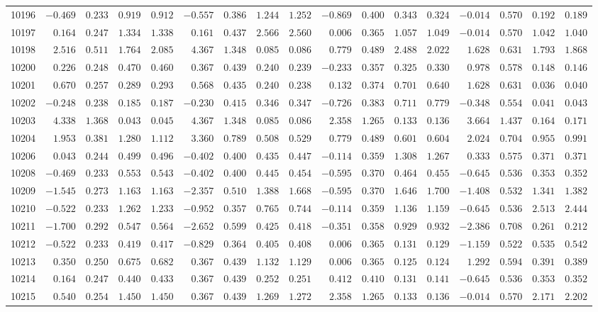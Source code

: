 \documentclass[6pt]{article}
\begin{document}
\begin{landscape}
{\begin{longtable}{lrrrrrrrrrrrrrrrr}
10196&$-0.469$&$0.233$&$0.919$&$0.912$&$-0.557$&$0.386$&$1.244$&$1.252$&$-0.869$&$0.400$&$0.343$&$0.324$&$-0.014$&$0.570$&$0.192$&$0.189$\tabularnewline
10197&$ 0.164$&$0.247$&$1.334$&$1.338$&$ 0.161$&$0.437$&$2.566$&$2.560$&$ 0.006$&$0.365$&$1.057$&$1.049$&$-0.014$&$0.570$&$1.042$&$1.040$\tabularnewline
10198&$ 2.516$&$0.511$&$1.764$&$2.085$&$ 4.367$&$1.348$&$0.085$&$0.086$&$ 0.779$&$0.489$&$2.488$&$2.022$&$ 1.628$&$0.631$&$1.793$&$1.868$\tabularnewline
10200&$ 0.226$&$0.248$&$0.470$&$0.460$&$ 0.367$&$0.439$&$0.240$&$0.239$&$-0.233$&$0.357$&$0.325$&$0.330$&$ 0.978$&$0.578$&$0.148$&$0.146$\tabularnewline
10201&$ 0.670$&$0.257$&$0.289$&$0.293$&$ 0.568$&$0.435$&$0.240$&$0.238$&$ 0.132$&$0.374$&$0.701$&$0.640$&$ 1.628$&$0.631$&$0.036$&$0.040$\tabularnewline
10202&$-0.248$&$0.238$&$0.185$&$0.187$&$-0.230$&$0.415$&$0.346$&$0.347$&$-0.726$&$0.383$&$0.711$&$0.779$&$-0.348$&$0.554$&$0.041$&$0.043$\tabularnewline
10203&$ 4.338$&$1.368$&$0.043$&$0.045$&$ 4.367$&$1.348$&$0.085$&$0.086$&$ 2.358$&$1.265$&$0.133$&$0.136$&$ 3.664$&$1.437$&$0.164$&$0.171$\tabularnewline
10204&$ 1.953$&$0.381$&$1.280$&$1.112$&$ 3.360$&$0.789$&$0.508$&$0.529$&$ 0.779$&$0.489$&$0.601$&$0.604$&$ 2.024$&$0.704$&$0.955$&$0.991$\tabularnewline
10206&$ 0.043$&$0.244$&$0.499$&$0.496$&$-0.402$&$0.400$&$0.435$&$0.447$&$-0.114$&$0.359$&$1.308$&$1.267$&$ 0.333$&$0.575$&$0.371$&$0.371$\tabularnewline
10208&$-0.469$&$0.233$&$0.553$&$0.543$&$-0.402$&$0.400$&$0.445$&$0.454$&$-0.595$&$0.370$&$0.464$&$0.455$&$-0.645$&$0.536$&$0.353$&$0.352$\tabularnewline
10209&$-1.545$&$0.273$&$1.163$&$1.163$&$-2.357$&$0.510$&$1.388$&$1.668$&$-0.595$&$0.370$&$1.646$&$1.700$&$-1.408$&$0.532$&$1.341$&$1.382$\tabularnewline
10210&$-0.522$&$0.233$&$1.262$&$1.233$&$-0.952$&$0.357$&$0.765$&$0.744$&$-0.114$&$0.359$&$1.136$&$1.159$&$-0.645$&$0.536$&$2.513$&$2.444$\tabularnewline
10211&$-1.700$&$0.292$&$0.547$&$0.564$&$-2.652$&$0.599$&$0.425$&$0.418$&$-0.351$&$0.358$&$0.929$&$0.932$&$-2.386$&$0.708$&$0.261$&$0.212$\tabularnewline
10212&$-0.522$&$0.233$&$0.419$&$0.417$&$-0.829$&$0.364$&$0.405$&$0.408$&$ 0.006$&$0.365$&$0.131$&$0.129$&$-1.159$&$0.522$&$0.535$&$0.542$\tabularnewline
10213&$ 0.350$&$0.250$&$0.675$&$0.682$&$ 0.367$&$0.439$&$1.132$&$1.129$&$ 0.006$&$0.365$&$0.125$&$0.124$&$ 1.292$&$0.594$&$0.391$&$0.389$\tabularnewline
10214&$ 0.164$&$0.247$&$0.440$&$0.433$&$ 0.367$&$0.439$&$0.252$&$0.251$&$ 0.412$&$0.410$&$0.131$&$0.141$&$-0.645$&$0.536$&$0.353$&$0.352$\tabularnewline
10215&$ 0.540$&$0.254$&$1.450$&$1.450$&$ 0.367$&$0.439$&$1.269$&$1.272$&$ 2.358$&$1.265$&$0.133$&$0.136$&$-0.014$&$0.570$&$2.171$&$2.202$\tabularnewline

\end{longtable}}
\end{landscape}
\end{document}
